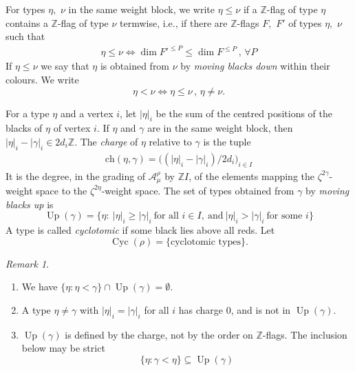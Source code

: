 \documentclass[11pt,reqno]{amsart}
\theoremstyle{definition}
\theoremstyle{remark}
\newtheorem{Remark}[Theorem]{Remark}
\def\bbZ{\mathbb Z}
\def\calA{\mathcal A}
\def\Up{\operatorname{Up}}
\def\Cyc{\operatorname{Cyc}}
\begin{document}
For types $\eta,$ $\nu$ in the same weight block, 
we write $\eta\leqslant\nu$ if a $\bbZ$-flag of type
$\eta$ contains a $\bbZ$-flag of type $\nu$ termwise, i.e., 
if there are $\bbZ$-flags $F,$ $F'$ of types $\eta,$ $\nu$ such that
\begin{align}\label{PO}\eta\leqslant\nu\iff\dim F'^{\leqslant P}\leqslant\dim F^{\leqslant P}\,,\,\forall P\end{align}
If $\eta\leqslant\nu$ we say that $\eta$ is obtained from $\nu$ by \emph{moving blacks down} within their colours.
We write
$$\eta<\nu\iff \eta\leqslant\nu\,,\,\eta\neq\nu.$$

For a type $\eta$ and a vertex $i$, let $|\eta|_i$ be the sum of the centred positions of the blacks of $\eta$ of vertex $i$. 
If $\eta$ and $\gamma$ are in the same weight block, then  $|\eta|_i-|\gamma|_i\in2d_i\bbZ.$ 
The  \emph{charge} of $\eta$ relative to $\gamma$ is the tuple 
\begin{align}\label{CEG}\mathrm{ch}(\eta,\gamma)=\big((|\eta|_i-|\gamma|_i)/2d_i\big)_{i\in I}\end{align}
It is the degree, in the grading of $\calA^\rho_\mu$ by $\bbZ I$, 
of the elements mapping the $\zeta^{2\gamma}$-weight space to the
$\zeta^{2\eta}$-weight space. 
The set of types obtained from $\gamma$ by \emph{moving blacks up} is
\[
\Up(\gamma)=\big\{\eta:\ |\eta|_i\geqslant|\gamma|_i\ \text{for all }i\in I,\ \text{and}\ |\eta|_i>|\gamma|_i\ \text{for some }i\big\}
\]
A type is called \emph{cyclotomic} if some black lies above all reds. Let 
$$\Cyc(\rho)=\{\text{cyclotomic types}\}.$$

\begin{Remark}\label{rem:Up}\hfill
\begin{enumerate}[label=$\mathrm{(\alph*)}$,leftmargin=8mm]
\item 
We have $\{\eta:\eta<\gamma\}\cap\Up(\gamma)=\emptyset$. 
\item  A type $\eta\neq\gamma$ 
with $|\eta|_i=|\gamma|_i$ for all $i$ has charge $0$,
and is not in $\Up(\gamma)$.
\item $\Up(\gamma)$ is defined by the charge, not by the order on $\bbZ$-flags. The inclusion below may be strict
 $$\{\eta:\gamma<\eta\}\subseteq\Up(\gamma)$$
\end{enumerate}
\end{Remark}
\end{document}
